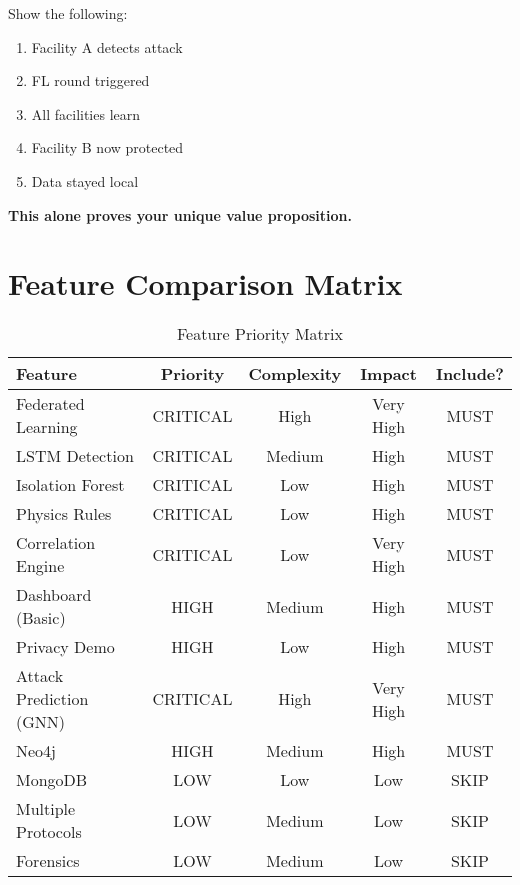 \documentclass[11pt,a4paper]{article}
\begin{document}
Show the following:
\begin{enumerate}[leftmargin=*]
    \item Facility A detects attack
    \item FL round triggered
    \item All facilities learn
    \item Facility B now protected
    \item Data stayed local
\end{enumerate}

\textbf{This alone proves your unique value proposition.}


\section{Feature Comparison Matrix}

\begin{table}[H]
\centering
\small
\begin{tabular}{@{}lcccc@{}}
\toprule
\textbf{Feature} & \textbf{Priority} & \textbf{Complexity} & \textbf{Impact} & \textbf{Include?} \\ \midrule
Federated Learning & CRITICAL & High & Very High & \textcolor{critical}{MUST} \\
LSTM Detection & CRITICAL & Medium & High & \textcolor{critical}{MUST} \\
Isolation Forest & CRITICAL & Low & High & \textcolor{critical}{MUST} \\
Physics Rules & CRITICAL & Low & High & \textcolor{critical}{MUST} \\
Correlation Engine & CRITICAL & Low & Very High & \textcolor{critical}{MUST} \\
Dashboard (Basic) & HIGH & Medium & High & \textcolor{critical}{MUST} \\
Privacy Demo & HIGH & Low & High & \textcolor{critical}{MUST} \\
Attack Prediction (GNN) & CRITICAL & High & Very High & \textcolor{critical}{MUST} \\
Neo4j & HIGH & Medium & High & \textcolor{critical}{MUST} \\
MongoDB & LOW & Low & Low & \textcolor{low}{SKIP} \\
Multiple Protocols & LOW & Medium & Low & \textcolor{low}{SKIP} \\
Forensics & LOW & Medium & Low & \textcolor{low}{SKIP} \\ \bottomrule
\end{tabular}
\caption{Feature Priority Matrix}
\end{table}
\end{document}
